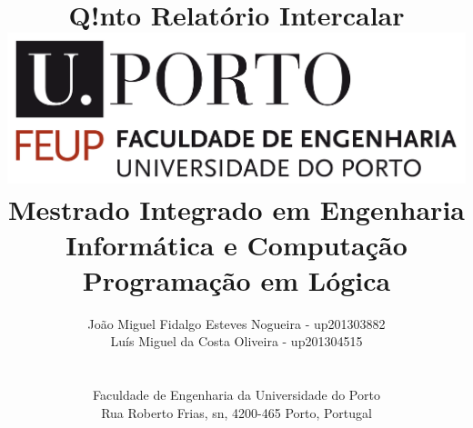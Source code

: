\documentclass[a4paper]{article}
\begin{document}
\setlength{\textwidth}{16cm}
\setlength{\textheight}{22cm}

\title{\Huge\textbf{Q!nto}\linebreak\linebreak\linebreak
\Large\textbf{Relatório Intercalar}\linebreak\linebreak
\linebreak\linebreak
\includegraphics[scale=0.1]{feup-logo.png}\linebreak\linebreak
\linebreak\linebreak
\Large{Mestrado Integrado em Engenharia Informática e Computação} \linebreak\linebreak
\Large{Programação em Lógica}\linebreak
}

\author{
João Miguel Fidalgo Esteves Nogueira - up201303882 \\
Luís Miguel da Costa Oliveira - up201304515 \\
\linebreak\linebreak \\
 \\ Faculdade de Engenharia da Universidade do Porto \\ Rua Roberto Frias, s\/n, 4200-465 Porto, Portugal \linebreak\linebreak\linebreak
\linebreak\linebreak\vspace{1cm}}

\maketitle
\thispagestyle{empty}
\end{document}
